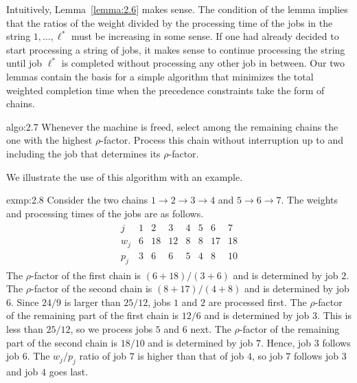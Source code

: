 Intuitively, Lemma~\ref{lemma:2.6} makes sense. The condition of the lemma 
implies that the ratios of the weight divided by the processing time of the 
jobs in the string $1, \dots, \ell^*$ must be increasing in some sense. 
If one had already decided to start processing a string of jobs, it makes 
sense to continue processing the string until job $\ell^*$ is completed 
without processing any other job in between. Our two lemmas contain the 
basis for a simple algorithm that minimizes the total weighted completion 
time when the precedence constraints take the form of chains.

\begin{algo}{algo:2.7}
    Whenever the machine is freed, select among the remaining chains the one 
    with the highest $\rho$-factor. Process this chain without interruption 
    up to and including the job that determines its $\rho$-factor.
\end{algo}

We illustrate the use of this algorithm with an example. 

\begin{exmp}{exmp:2.8}
    Consider the two chains $1 \to 2 \to 3 \to 4$ and $5 \to 6 \to 7$. 
    The weights and processing times of the jobs are as follows. 
    \begin{align*}
        \begin{array}{c|ccccccc}
        j   & 1 & 2  & 3  & 4 & 5 & 6  & 7  \\ \hline
        w_j & 6 & 18 & 12 & 8 & 8 & 17 & 18 \\
        p_j & 3 & 6  & 6  & 5 & 4 & 8  & 10
        \end{array}
    \end{align*}
    The $\rho$-factor of the first chain is $(6+18)/(3+6)$ and is determined 
    by job $2$. The $\rho$-factor of the second chain is $(8+17)/(4+8)$ and 
    is determined by job $6$. Since $24/9$ is larger than $25/12$, jobs 
    $1$ and $2$ are processed first. The $\rho$-factor of the remaining 
    part of the first chain is $12/6$ and is determined by job $3$. This is 
    less than $25/12$, so we process jobs $5$ and $6$ next. The $\rho$-factor 
    of the remaining part of the second chain is $18/10$ and is determined by 
    job $7$. Hence, job $3$ follows job $6$. The $w_j/p_j$ ratio of job $7$ 
    is higher than that of job $4$, so job $7$ follows job $3$ and job $4$ 
    goes last. 
\end{exmp}
